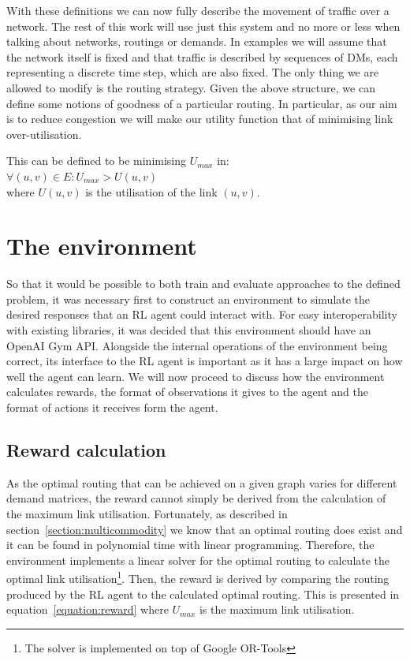 With these definitions we can now fully describe the movement of traffic over a network. The rest of this work will use just this system and no more or less when talking about networks, routings or demands. In examples we will assume that the network itself is fixed and that traffic is described by sequences of DMs, each representing a discrete time step, which are also fixed. The only thing we are allowed to modify is the routing strategy. Given the above structure, we can define some notions of goodness of a particular routing. In particular, as our aim is to reduce congestion we will make our utility function that of minimising link over-utilisation.

This can be defined to be minimising $U_{max}$ in:\\
$\forall (u,v) \in E: U_{max} > U(u,v)$\\
where $U(u,v)$ is the utilisation of the link $(u,v)$.


\section{The environment}
So that it would be possible to both train and evaluate approaches to the defined problem, it was necessary first to construct an environment to simulate the desired responses that an RL agent could interact with. For easy interoperability with existing libraries, it was decided that this environment should have an OpenAI Gym\cite{brockman2016openai} API. Alongside the internal operations of the environment being correct, its interface to the RL agent is important as it has a large impact on how well the agent can learn. We will now proceed to discuss how the environment calculates rewards, the format of observations it gives to the agent and the format of actions it receives form the agent.

\subsection{Reward calculation}
As the optimal routing that can be achieved on a given graph varies for different demand matrices, the reward cannot simply be derived from the calculation of the maximum link utilisation. Fortunately, as described in section~\ref{section:multicommodity} we know that an optimal routing does exist and it can be found in polynomial time with linear programming. Therefore, the environment implements a linear solver for the optimal routing to calculate the optimal link utilisation\footnote{The solver is implemented on top of Google OR-Tools\cite{ortools}}. Then, the reward is derived by comparing the routing produced by the RL agent to the calculated optimal routing. This is presented in equation~\ref{equation:reward} where $U_{max}$ is the maximum link utilisation.

